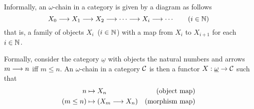 \begin{definition}
Informally, an $\omega$-chain in a category is given by a diagram as follows
\[
    X_0 \longrightarrow X_1 \longrightarrow X_2 \longrightarrow \cdots \longrightarrow X_i
    \longrightarrow \cdots
    \qquad(i\in\mathbb{N})
\]
that is, a family of objects $X_i$~($i\in\mathbb{N}$) with a map from $X_i$ to
$X_{i+1}$ for each $i \in \mathbb{N}$.

Formally, consider the category $\underline{\omega}$ with objects the natural
numbers and arrows $m \longrightarrow n$ iff $m \leq n$. An $\omega$-chain in a
category $\mathcal{C}$ is then a functor $X : \underline{\omega} \to \mathcal{C}$
such that
\begin{align*}
    n & \mapsto X_n & (\text{object map}) \\
    (m \leq n) & \mapsto (X_m \longrightarrow X_n) &(\text{morphism map})
\end{align*}

\end{definition}

